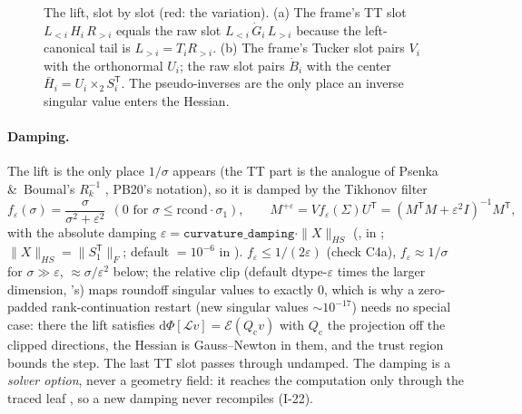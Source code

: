 \documentclass[11pt]{article}
\newcommand{\Lift}{\mathcal{L}}
\newcommand{\Emap}{\mathcal{E}}
\newcommand{\T}{\mathsf{T}}
\newcommand{\eps}{\varepsilon}
\theoremstyle{definition}
\theoremstyle{plain}
\begin{document}
\begin{figure}[t]
\caption{The lift, slot by slot (red: the variation). (a) The frame's TT slot $L_{<i}\,H_i\,R_{>i}$ equals the
raw slot $L_{<i}\,\dot G_i\,L_{>i}$ because the left-canonical tail is $L_{>i}=T_iR_{>i}$. (b) The frame's Tucker
slot pairs $V_i$ with the orthonormal $U_i$; the raw slot pairs $\dot B_i$ with the center
$\bar H_i=U_i\times_2S_i^\T$. The pseudo-inverses are the only place an inverse singular value enters the Hessian.}
\label{fig:lift}
\end{figure}

\paragraph{Damping.} The lift is the only place $1/\sigma$ appears (the TT part is the analogue of Psenka \&\ Boumal's
$R_k^{-1}$ \cite{PB20}, PB20's notation), so it is damped by the Tikhonov filter
\begin{equation}
  \label{eq:filter}
  f_\eps(\sigma)=\frac{\sigma}{\sigma^2+\eps^2}\ \ (0\text{ for }\sigma\le\mathrm{rcond}\cdot\sigma_1),\qquad
  M^{+\eps}=V f_\eps(\Sigma)U^\T=(M^\T M+\eps^2I)^{-1}M^\T,
\end{equation}
with the absolute damping $\eps=\texttt{curvature\_damping}\cdot\|X\|_{HS}$
(,  in ;
$\|X\|_{HS}=\|S_1^\T\|_F$; default  $=10^{-6}$ in ).
$f_\eps\le1/(2\eps)$ (check C4a), $f_\eps\approx1/\sigma$ for $\sigma\gg\eps$, $\approx\sigma/\eps^2$ below; the
relative clip (default dtype-$\eps$ times the larger dimension, 's) maps roundoff
singular values to exactly $0$, which is why a zero-padded rank-continuation restart (new singular values
$\sim10^{-17}$) needs no special case: there the lift satisfies $\mathrm d\Phi[\Lift v]=\Emap(Q_{\mathrm c}v)$ with $Q_{\mathrm c}$ the
projection off the clipped directions, the Hessian is Gauss--Newton in them, and the trust region bounds the step.
The last TT slot passes through undamped. The damping is a \emph{solver option}, never a geometry field: it reaches
the computation only through the traced leaf , so a new damping never recompiles (I-22).
\end{document}
